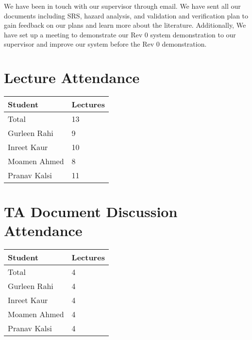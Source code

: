 \documentclass{article}
\begin{document}
We have been in touch with our supervisor through email. We have sent all our documents including SRS, hazard analysis, and validation and verification plan to gain feedback on our plans and learn more about the literature. Additionally, We have set up a meeting to demonstrate our Rev 0 system demonstration to our supervisor and improve our system before the Rev 0 demonstration. 


\section{Lecture Attendance}


\begin{table}[H]
\centering
\begin{tabular}{ll}
\toprule
\textbf{Student} & \textbf{Lectures}\\
\midrule
Total & 13\\
Gurleen Rahi & 9\\ 
Inreet Kaur & 10\\
Moamen Ahmed & 8\\
Pranav Kalsi & 11\\
\bottomrule
\end{tabular}
\end{table}


\section{TA Document Discussion Attendance}


\begin{table}[H]
\centering
\begin{tabular}{ll}
\toprule
\textbf{Student} & \textbf{Lectures}\\
\midrule
Total & 4\\
Gurleen Rahi & 4\\
Inreet Kaur & 4\\
Moamen Ahmed & 4\\
Pranav Kalsi & 4\\
\bottomrule
\end{tabular}
\end{table}
\end{document}
